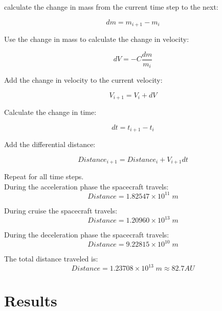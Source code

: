 \documentclass[journal ]{new-aiaa}
\begin{document}
calculate the change in mass from the current time step to the next:

\begin{equation}
    dm = m_{i+1} - m_i
\end{equation}

Use the change in mass to calculate the change in velocity:

\begin{equation}
    dV = -C \frac{dm}{m_i}
\end{equation}

Add the change in velocity to the current velocity:

\begin{equation}
    V_{i+1} = V_i + dV
\end{equation}

Calculate the change in time:

\begin{equation}
    dt = t_{i+1} - t_i
\end{equation}

Add the differential distance:

\begin{equation}
    Distance_{i+1} = Distance_i + V_{i+1} dt 
\end{equation}

Repeat for all time steps.\\

\noindent During the acceleration phase the spacecraft travels:
\begin{equation*}
    Distance = \boxed{1.82547 \times 10^{11}\;m}
\end{equation*}

\noindent During cruise the spacecraft travels:
\begin{equation*}
    Distance = \boxed{1.20960 \times 10^{13}\;m}
\end{equation*}

\noindent During the deceleration phase the spacecraft travels:
\begin{equation*}
    Distance = \boxed{9.22815 \times 10^{10}\;m}
\end{equation*}

\noindent The total distance traveled is:
\begin{equation*}
    Distance = \boxed{1.23708 \times 10^{13}\;m \approx 82.7 AU}
\end{equation*}


\pagebreak 
\section{Results}
\end{document}
